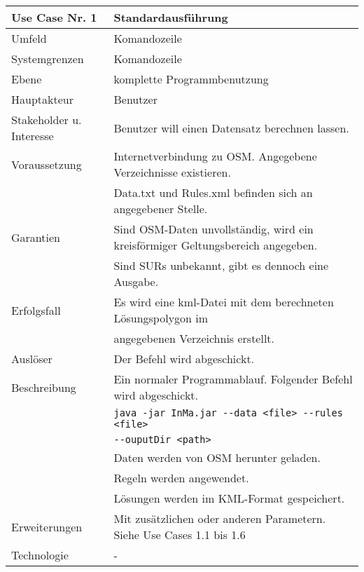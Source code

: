 \begin{tabular}{| l | l |}
 \hline
 \textbf{Use Case Nr. 1} & Standardausführung\\
 \hline
 Umfeld & Komandozeile\\
 \hline
 Systemgrenzen & Komandozeile\\
 \hline
 Ebene & komplette Programmbenutzung\\
 \hline
 Hauptakteur & Benutzer\\
 \hline
 Stakeholder u. Interesse & Benutzer will einen Datensatz berechnen lassen.\\
 \hline
 Voraussetzung & Internetverbindung zu OSM. Angegebene Verzeichnisse existieren.\\
	      & Data.txt und Rules.xml befinden sich an angegebener Stelle. \\
 \hline
 Garantien & Sind OSM-Daten unvollständig, wird ein kreisförmiger Geltungsbereich angegeben.\\
	  & Sind SURs unbekannt, gibt es dennoch eine Ausgabe.\\
 \hline
 Erfolgsfall & Es wird eine kml-Datei mit dem berechneten Lösungspolygon im\\
	    & angegebenen Verzeichnis erstellt.\\
 \hline
 Auslöser & Der Befehl wird abgeschickt.\\
 \hline
 Beschreibung & Ein normaler Programmablauf. Folgender Befehl wird abgeschickt.\\
	    & \verb|java -jar InMa.jar --data <file> --rules <file>|\\
	    & \hspace{24pt} \verb|--ouputDir <path>|\\
	    & Daten werden von OSM herunter geladen.\\
	    & Regeln werden angewendet.\\
	    & Lösungen werden im KML-Format gespeichert.\\
 \hline
 Erweiterungen & Mit zusätzlichen oder anderen Parametern. Siehe Use Cases 1.1 bis 1.6\\
 \hline
 Technologie & -\\
 \hline
\end{tabular}



